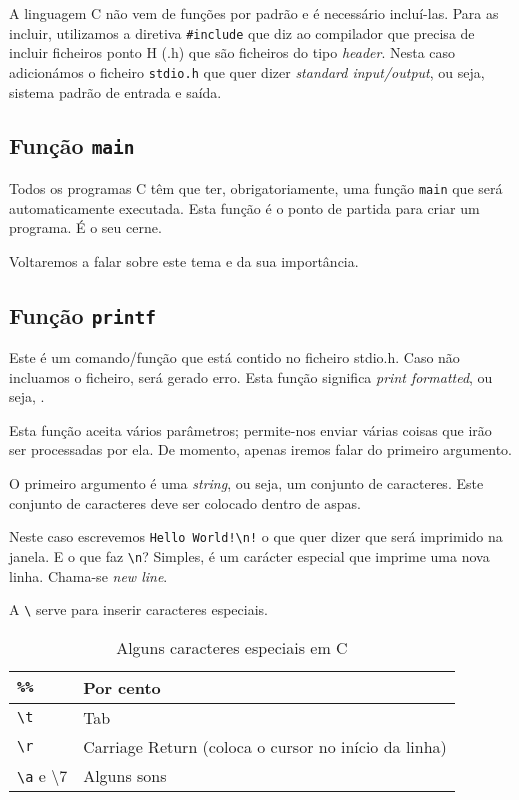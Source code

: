 A linguagem C não vem  de funções por padrão e é necessário incluí-las. Para as incluir, utilizamos a diretiva \texttt{\#include} que diz ao compilador que precisa de incluir ficheiros ponto H (.h) que são ficheiros do tipo \textit{header}.
Nesta caso adicionámos o ficheiro \texttt{stdio.h} que quer dizer \textit{standard input/output}, ou seja, sistema padrão de entrada e saída.

\subsection{Função \texttt{main}}

Todos os programas C têm que ter, obrigatoriamente, uma função \texttt{main} que será automaticamente executada. Esta função é o ponto de partida para criar um programa. É o seu cerne.

Voltaremos a falar sobre este tema e da sua importância.

\subsection{Função \texttt{printf}}

Este é um comando/função que está contido no ficheiro stdio.h. Caso não incluamos o ficheiro, será gerado erro. Esta função significa \textit{print formatted}, ou seja, .

Esta função aceita vários parâmetros; permite-nos enviar várias coisas que irão ser processadas por ela. De momento, apenas iremos falar do primeiro argumento.

O primeiro argumento é uma \textit{string}, ou seja, um conjunto de caracteres. Este conjunto de caracteres deve ser colocado dentro de aspas.

Neste caso escrevemos \texttt{Hello World!\textbackslash n!} o que quer dizer que será imprimido  na janela. E o que faz \texttt{\textbackslash n}? Simples, é um carácter especial que imprime uma nova linha. Chama-se \textit{new line}.

A \texttt{\textbackslash} serve para inserir caracteres especiais.

\begin{table}[h]
\center\begin{tabular}{|l|l|}
\hline
\texttt{\%\%}     & Por cento                                            \\ \hline
\texttt{\textbackslash t}      & Tab                                                  \\ \hline
\texttt{\textbackslash r}      & Carriage Return (coloca o cursor no início da linha) \\ \hline
\texttt{\textbackslash a} e \textbackslash 7 & Alguns sons                                          \\ \hline
\end{tabular}
\caption{Alguns caracteres especiais em C}
\end{table}

